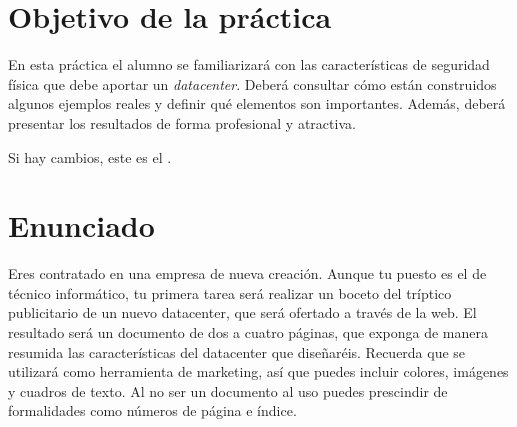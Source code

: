 
\usepackage{eurosym}
\usepackage{needspace}




\renewcommand{\hmwkTitle}{Publicidad de datacenter}
\renewcommand{\hmwkClass}{Seguridad Informática}

\usepackage{blindtext}






\primerapagina

\setlength{\parindent}{1em}
\setlength{\parskip}{1em}

\section{Objetivo de la práctica}
En esta práctica el alumno se familiarizará con las características de seguridad física que debe aportar un \textit{datacenter}. Deberá consultar cómo están construidos algunos ejemplos reales y definir qué elementos son importantes. Además, deberá presentar los resultados de forma profesional y atractiva.

Si hay cambios, este es el  .




\section{Enunciado}
Eres contratado en una empresa de nueva creación. Aunque tu puesto es el de técnico informático, tu primera tarea será realizar un boceto del tríptico publicitario de un nuevo datacenter, que será ofertado a través de la web.  El resultado será un documento de dos a cuatro páginas, que exponga de manera resumida las características del datacenter que diseñaréis. Recuerda que se utilizará como herramienta de marketing, así que puedes incluir colores, imágenes y cuadros de texto. Al no ser un documento al uso puedes prescindir de formalidades como números de página e índice.

